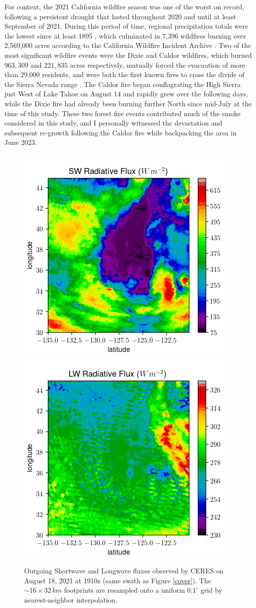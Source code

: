 \documentclass[12pt]{article}
\begin{document}
    For context, the 2021 California wildfire season was one of the worst on record, following a persistent drought that lasted throughout 2020 and until at least September of 2021. During this period of time, regional precipitation totals were the lowest since at least 1895 \cite{mankin_noaa_2021}, which culminated in 7,396 wildfires burning over 2,569,000 acres according to the California Wildfire Incident Archive \cite{the_department_of_forestry_and_fire_protection_2021_nodate}. Two of the most significant wildfire events were the Dixie and Caldor wildfires, which burned $963,309$ and $221,835$ acres respectively, mutually forced the evacuation of more than 29,000 residents, and were both the first known fires to cross the divide of the Sierra Nevada range \cite{chan_unprecedented_2021}\cite{the_department_of_forestry_and_fire_protection_2021_nodate}. The Caldor fire began conflagrating the High Sierra just West of Lake Tahoe on August 14 and rapidly grew over the following days, while the Dixie fire had already been burning further North since mid-July at the time of this study. These two forest fire events contributed much of the smoke considered in this study, and I personally witnessed the devastation and subsequent re-growth following the Caldor fire while backpacking the area in June 2023.

\begin{figure}[h!]\label{flux-interp}
    \centering
    \begin{center}
        \includegraphics[width=.48\linewidth]{figs/interp_swflux.png}
        \includegraphics[width=.48\linewidth]{figs/interp_lwflux.png}
    \end{center}
    \caption{Outgoing Shortwave and Longwave fluxes observed by CERES on August 18, 2021 at 1910z (same swath as Figure \ref{cover}). The $\sim16\times32\,\si{km}$ footprints are resampled onto a uniform $0.1^\circ$ grid by nearest-neighbor interpolation.}
\end{figure}
\end{document}
